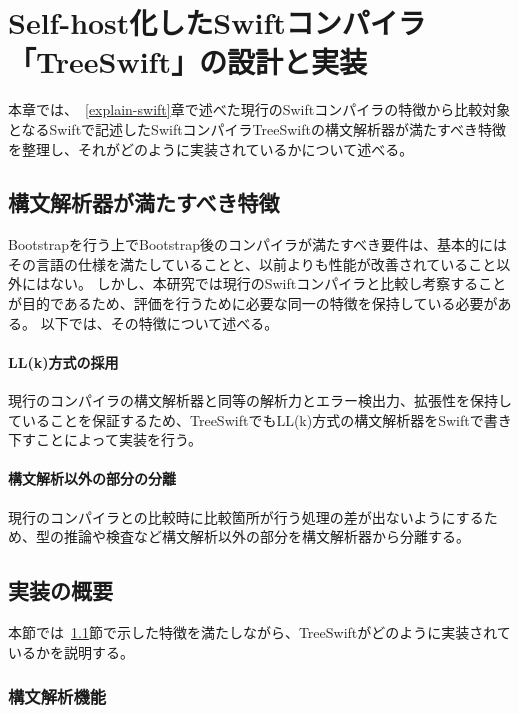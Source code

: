 \chapter{Self-host化したSwiftコンパイラ「TreeSwift」の設計と実装}
\label{implementation}

本章では、~\ref{explain-swift}章で述べた現行のSwiftコンパイラの特徴から比較対象となるSwiftで記述したSwiftコンパイラTreeSwiftの構文解析器が満たすべき特徴を整理し、それがどのように実装されているかについて述べる。

\section{構文解析器が満たすべき特徴}
\label{treeswift:requirements}

Bootstrapを行う上でBootstrap後のコンパイラが満たすべき要件は、基本的にはその言語の仕様を満たしていることと、以前よりも性能が改善されていること以外にはない。
しかし、本研究では現行のSwiftコンパイラと比較し考察することが目的であるため、評価を行うために必要な同一の特徴を保持している必要がある。
以下では、その特徴について述べる。

\subsubsection{LL(k)方式の採用}

現行のコンパイラの構文解析器と同等の解析力とエラー検出力、拡張性を保持していることを保証するため、TreeSwiftでもLL(k)方式の構文解析器をSwiftで書き下すことによって実装を行う。

\subsubsection{構文解析以外の部分の分離}

現行のコンパイラとの比較時に比較箇所が行う処理の差が出ないようにするため、型の推論や検査など構文解析以外の部分を構文解析器から分離する。


\section{実装の概要}

本節では~\ref{treeswift:requirements}節で示した特徴を満たしながら、TreeSwiftがどのように実装されているかを説明する。


\subsection{構文解析機能}

